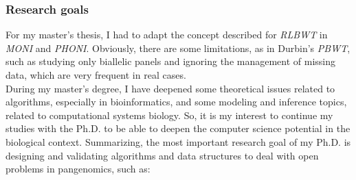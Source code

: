 \documentclass[a4paper,11pt, oneside]{article}
\begin{document}
\subsubsection*{Research goals}
For my master's thesis, I had to adapt the concept described for
\textit{RLBWT} in \textit{MONI} and \textit{PHONI}. 
Obviously, there are some limitations, as in Durbin's \textit{PBWT}, such as
studying only biallelic panels and ignoring the management of missing data,
which are very frequent in real cases. \\
During my master’s degree, I have deepened some theoretical
issues related to algorithms, especially in bioinformatics, and
some modeling and inference topics, related to computational 
systems biology. So, it is my interest to continue my studies with the Ph.D.
to be able to deepen the computer science potential in the biological
context.
Summarizing, the most important research goal of my Ph.D. is designing and
validating algorithms and data structures to deal with open problems in
pangenomics, such as: 
\vspace{-1.25mm}
\end{document}
